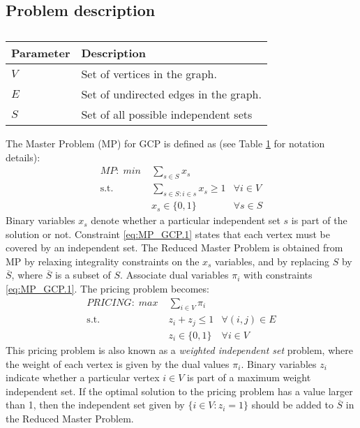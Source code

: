 \documentclass[a4paper]{article}
\begin{document}
\subsection{Problem description}
\begin{table}[ht]
\centering
\begin{tabular}{ll}
\toprule
\textbf{Parameter} 	& \textbf{Description}\\
\midrule
$V$		& Set of vertices in the graph.\\
$E$		& Set of undirected edges in the graph.\\
$S$		& Set of all possible independent sets\\
\bottomrule
\end{tabular}
\caption{}
\label{tbl:gcp} 
\end{table}

The Master Problem (MP) for GCP is defined as (see Table \ref{tbl:gcp} for notation details):
\begin{align}
\label{eq:MP_GCP.0} \mathit{MP:}\; min\; &\sum_{s\in S} x_s &\\
\label{eq:MP_GCP.1} \mbox{s.t. }&\sum_{s \in S: i\in s} x_s \geq 1 & \forall i\in V\\
\label{eq:MP_GCP.5} &x_s\in \{0,1\} &\forall s\in S
\end{align}
Binary variables $x_s$ denote whether a particular independent set $s$ is part of the solution or not. Constraint \eqref{eq:MP_GCP.1} states that each vertex must be covered by an independent set. The Reduced Master Problem is obtained from MP by relaxing integrality constraints on the $x_s$ variables, and by replacing $S$ by $\overline{S}$, where $\overline{S}$ is a subset of $S$.
Associate dual variables $\pi_i$ with constraints \eqref{eq:MP_GCP.1}. The pricing problem becomes:
\begin{align}
\label{eq:PRICE_GCP.0} \mathit{PRICING:}\; max\; &\sum_{i\in V} \pi_i &\\
\label{eq:PRICE_GCP.1} \mbox{s.t. }&z_i+z_j \leq 1 & \forall (i,j)\in E\\
\label{eq:PRICE_GCP.5} &z_i\in \{0,1\} &\forall i\in V
\end{align}
This pricing problem is also known as a \emph{weighted independent set} problem, where the weight of each vertex is given by the dual values $\pi_i$. Binary variables $z_i$ indicate whether a particular vertex $i\in V$ is part of a maximum weight independent set. If the optimal solution to the pricing problem has a value larger than 1, then the independent set given by $\{i\in V: z_i=1\}$ should be added to $\overline{S}$ in the Reduced Master Problem.\\
\end{document}
